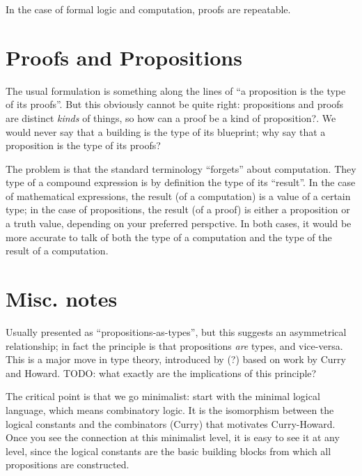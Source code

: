 In the case of formal logic and computation, proofs are repeatable.

\section{Proofs and Propositions}

The usual formulation is something along the lines of \enquote{a
  proposition is the type of its proofs}.  But this obviously cannot
be quite right: propositions and proofs are distinct \textit{kinds} of
things, so how can a proof be a kind of proposition?.  We would never
say that a building is the type of its blueprint; why say that a
proposition is the type of its proofs?

The problem is that the standard terminology ``forgets'' about
computation.  They type of a compound expression is by definition the
type of its \enquote{result}.  In the case of mathematical
expressions, the result (of a computation) is a value of a certain
type; in the case of propositions, the result (of a proof) is either a
proposition or a truth value, depending on your preferred perspctive.
In both cases, it would be more accurate to talk of both the type of a
computation and the type of the result of a computation.



\section{Misc. notes}
\begin{ednote}
  Usually presented as ``propositions-as-types'', but this suggests an
  asymmetrical relationship; in fact the principle is that
  propositions \emph{are} types, and vice-versa.  This is a major move
  in type theory, introduced by \ML(?) based on work by Curry and
  Howard.  TODO: what exactly are the implications of this principle?
\end{ednote}

\begin{ednote}
  The critical point is that we go minimalist: start with the minimal
  logical language, which means combinatory logic.  It is the
  isomorphism between the logical constants and the combinators
  (Curry) that motivates Curry-Howard.  Once you see the connection at
  this minimalist level, it is easy to see it at any level, since the
  logical constants are the basic building blocks from which all
  propositions are constructed.
\end{ednote}


